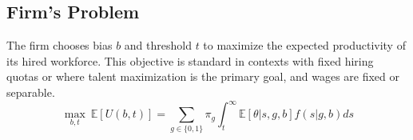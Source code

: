 \subsection{Firm's Problem}
The firm chooses bias $b$ and threshold $t$ to maximize the expected productivity of its hired workforce. This objective is standard in contexts with fixed hiring quotas or where talent maximization is the primary goal, and wages are fixed or separable.
\begin{equation}
\max_{b, t} \ \mathbb{E}[U(b,t)] = \sum_{g \in \{0,1\}} \pi_g \int_t^\infty \mathbb{E}[\theta | s, g, b] f(s|g, b) ds
\end{equation}